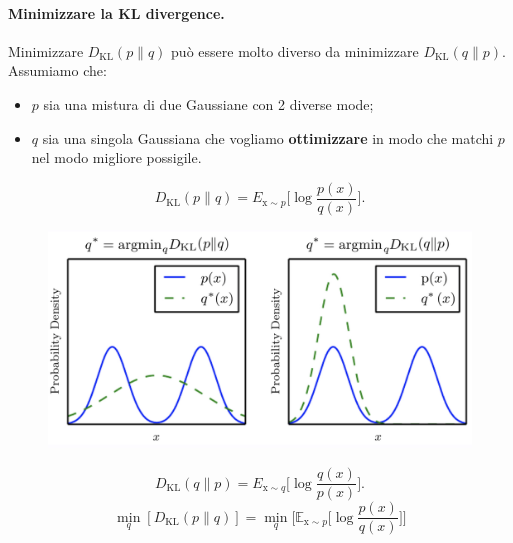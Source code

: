 \paragraph{Minimizzare la KL divergence.} Minimizzare $D_{\text{KL}}(p\|q)$ può essere molto diverso da minimizzare $D_{\text{KL}}(q\|p)$.
Assumiamo che:
\begin{itemize}
    \item $p$ sia una mistura di due Gaussiane con 2 diverse mode;
    \item $q$ sia una singola Gaussiana che vogliamo \textbf{ottimizzare} in modo che matchi $p$ nel modo migliore possigile.
\end{itemize}
\begin{equation}
     D_{\text{KL}}(p\|q)=E_{\text{x}\sim p}\Big[ \log\frac{p(x)}{q(x)}\Big].
\end{equation}
\begin{figure}[!h]
    \includegraphics[scale=.6]{images/prerequisites/kl01.png}
    \centering
\end{figure}
\begin{equation}
     D_{\text{KL}}(q\|p)=E_{\text{x}\sim q}\Big[ \log\frac{q(x)}{p(x)}\Big].
\end{equation}
\newpage
\begin{equation}
    \min_q[D_{\text{KL}}(p\|q)]=\min_q\Big[ \mathbb{E}_{\text{x}\sim p}\Big[\log\frac{p(x)}{q(x)} \Big]\Big]
\end{equation}
